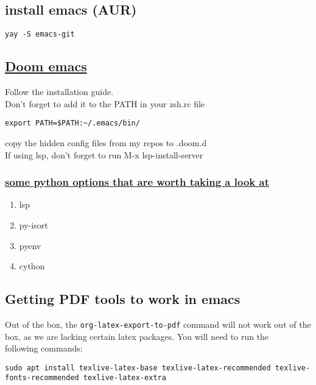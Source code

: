 \documentclass[11pt]{article}
\begin{document}
\subsection{install emacs (AUR)}
\label{sec:orgd0b5ec2}
\begin{verbatim}
yay -S emacs-git
\end{verbatim}
\subsection{\href{https://github.com/hlissner/doom-emacs}{Doom emacs}}
\label{sec:org0a27a5e}
Follow the installation guide.\\
Don't forget to add it to the PATH in your zsh.rc file\\
\begin{verbatim}
export PATH=$PATH:~/.emacs/bin/
\end{verbatim}
copy the hidden config files from my repos to .doom.d\\
If using lsp, don't forget to run M-x lsp-install-server\\
\subsubsection{\href{https://github.com/hlissner/doom-emacs/blob/develop/modules/lang/python/README.org}{some python options that are worth taking a look at}}
\label{sec:org9e6fec4}
\begin{enumerate}
\item lsp
\label{sec:orgdecdb69}
\item py-isort
\label{sec:orgff31e89}
\item pyenv
\label{sec:org42c4a48}
\item cython
\label{sec:org5850673}
\end{enumerate}
\subsection{Getting PDF tools to work in emacs}
\label{sec:org243d508}
Out of the box, the \texttt{org-latex-export-to-pdf} command will not work out of the\\
box, as we are lacking certain latex packages. You will need to run the\\
following commands:\\
\begin{verbatim}
sudo apt install texlive-latex-base texlive-latex-recommended texlive-fonts-recommended texlive-latex-extra 
\end{verbatim}
\end{document}
